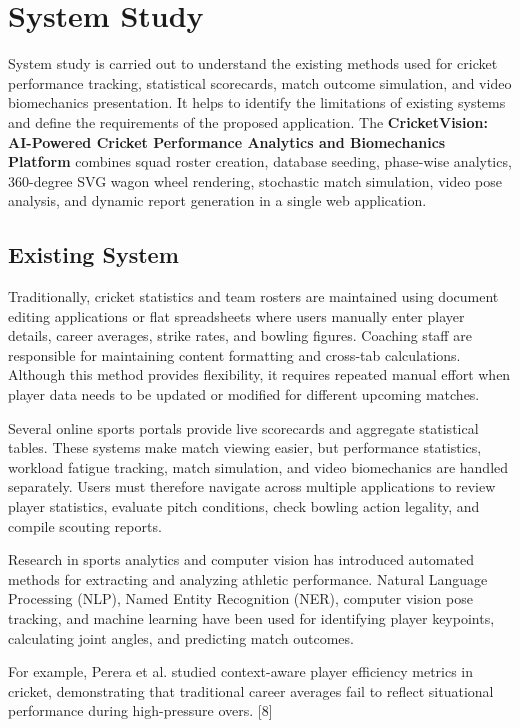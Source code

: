 \chapter{System Study}

System study is carried out to understand the existing methods used for cricket performance tracking, statistical scorecards, match outcome simulation, and video biomechanics presentation. It helps to identify the limitations of existing systems and define the requirements of the proposed application. The \textbf{CricketVision: AI-Powered Cricket Performance Analytics and Biomechanics Platform} combines squad roster creation, database seeding, phase-wise analytics, 360-degree SVG wagon wheel rendering, stochastic match simulation, video pose analysis, and dynamic report generation in a single web application.

\section{Existing System}
Traditionally, cricket statistics and team rosters are maintained using document editing applications or flat spreadsheets where users manually enter player details, career averages, strike rates, and bowling figures. Coaching staff are responsible for maintaining content formatting and cross-tab calculations. Although this method provides flexibility, it requires repeated manual effort when player data needs to be updated or modified for different upcoming matches.

Several online sports portals provide live scorecards and aggregate statistical tables. These systems make match viewing easier, but performance statistics, workload fatigue tracking, match simulation, and video biomechanics are handled separately. Users must therefore navigate across multiple applications to review player statistics, evaluate pitch conditions, check bowling action legality, and compile scouting reports.

Research in sports analytics and computer vision has introduced automated methods for extracting and analyzing athletic performance. Natural Language Processing (NLP), Named Entity Recognition (NER), computer vision pose tracking, and machine learning have been used for identifying player keypoints, calculating joint angles, and predicting match outcomes.

For example, Perera et al. studied context-aware player efficiency metrics in cricket, demonstrating that traditional career averages fail to reflect situational performance during high-pressure overs. [8]

